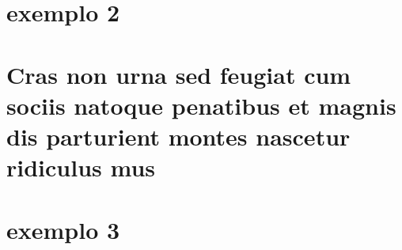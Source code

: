 \documentclass[
	12pt,				%
	openright,			%
	twoside,			%
	a4paper,			%
	english,			%
	french,				%
	spanish,			%
	brazil				%
	]{abntex2}
\begin{document}

\begin{anexosenv}

\partanexos

\chapter{exemplo 2}
\lipsum[30]

\chapter{Cras non urna sed feugiat cum sociis natoque penatibus et magnis dis
parturient montes nascetur ridiculus mus}

\lipsum[31]

\chapter{exemplo 3}

\lipsum[32]

\end{anexosenv}

\printindex
\end{document}
